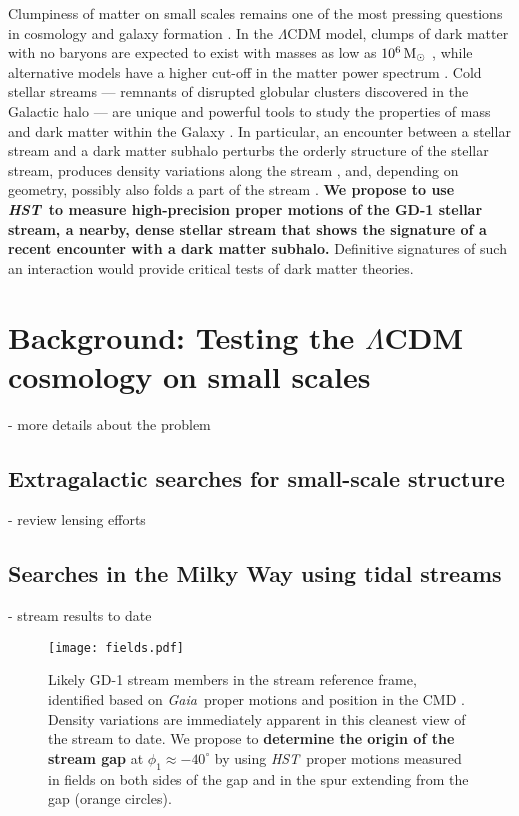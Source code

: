 \documentclass[12pt]{article}
\newcommand{\hst}{\textsl{HST}}
\newcommand{\gaia}{\textsl{Gaia}}
\begin{document}
%
%
\justification          %

Clumpiness of matter on small scales remains one of the most pressing questions in cosmology and galaxy formation \parencite{bullock2017}.
In the $\Lambda$CDM model, clumps of dark matter with no baryons are expected to exist with masses as low as $10^{6}\rm\,M_\odot$ \parencite{springel2008}, while alternative models have a higher cut-off in the matter power spectrum \parencite[e.g.,][]{bode2001,hu2000}.
Cold stellar streams --- remnants of disrupted globular clusters discovered in the Galactic halo \parencite{gc2016} --- are unique and powerful tools to study the properties of mass and dark matter within the Galaxy \parencite[e.g.,][]{bonaca2018}.
In particular, an encounter between a stellar stream and a dark matter subhalo perturbs the orderly structure of the stellar stream, produces density variations along the stream \parencite[e.g.,][]{carlberg2012}, and, depending on geometry, possibly also folds a part of the stream \parencite[e.g.,][]{yoon2011}.
{\bf We propose to use \hst\ to measure high-precision proper motions of the GD-1 stellar stream, a nearby, dense stellar stream that shows the signature of a recent encounter with a dark matter subhalo.}
Definitive signatures of such an interaction would provide critical tests of dark matter theories.

\section*{Background: Testing the $\Lambda$CDM cosmology on small scales}
- more details about the problem

\subsection*{Extragalactic searches for small-scale structure}
- review lensing efforts

\subsection*{Searches in the Milky Way using tidal streams}
- stream results to date

\begin{figure}
\begin{center}
\texttt{[image: fields.pdf]}
\end{center}
\caption{
Likely GD-1 stream members in the stream reference frame, identified based on \gaia\ proper motions and position in the CMD \parencite{pwb2018}.
Density variations are immediately apparent in this cleanest view of the stream to date.
We propose to {\bf determine the origin of the stream gap} at $\phi_1\approx-40^\circ$ by using \hst\ proper motions measured in fields on both sides of the gap and in the spur extending from the gap (orange circles).
}
\label{fig:fields}
\end{figure}
\end{document}

